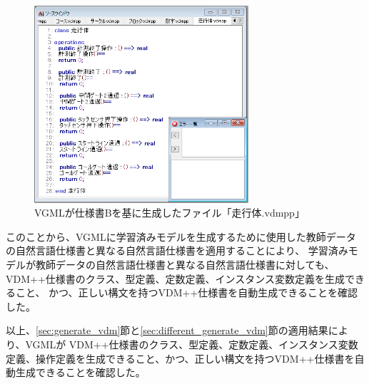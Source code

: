 \begin{figure}[tp]
    \begin{center}
    \includegraphics[width=300]{image/indicationB_vdm6.PNG}
    \caption{VGMLが仕様書Bを基に生成したファイル「走行体.vdmpp」}
    \label{fig:indicationB_vdm6}
    \end{center}
\end{figure}

このことから、VGMLに学習済みモデルを生成するために使用した教師データの自然言語仕様書と異なる自然言語仕様書を適用することにより、
学習済みモデルが教師データの自然言語仕様書と異なる自然言語仕様書に対しても、
VDM++仕様書のクラス、型定義、定数定義、インスタンス変数定義を生成できること、
かつ、正しい構文を持つVDM++仕様書を自動生成できることを確認した。

以上、\ref{sec:generate_vdm}節と\ref{sec:different_generate_vdm}節の適用結果により、VGMLが
VDM++仕様書のクラス、型定義、定数定義、インスタンス変数定義、操作定義を生成できること、かつ、正しい構文を持つVDM++仕様書を自動生成できることを確認した。
